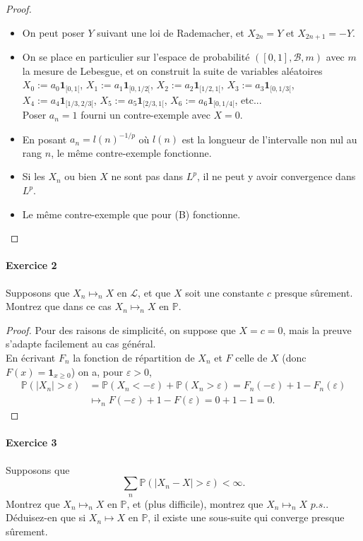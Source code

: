 \documentclass{article}
\theoremstyle{definition}
\numberwithin{equation}{section}
\begin{document}
\begin{proof}~
\begin{itemize}
\item[(A)] On peut poser $Y$ suivant une loi de Rademacher, et $X_{2n}=Y$ et $X_{2n+1}=-Y$.
\item[(B)] On se place en particulier sur l'espace de probabilité $([0,1],\mathcal{B},m)$ avec $m$ la mesure de Lebesgue, et on construit la suite de variables aléatoires $X_0:=a_0\mathbf{1}_{[0,1[}$, $X_1:=a_1\mathbf{1}_{[0,1/2[}$, $X_2:=a_2\mathbf{1}_{[1/2,1[}$, $X_3:=a_3\mathbf{1}_{[0,1/3[}$, $X_4:=a_4\mathbf{1}_{[1/3,2/3[}$, $X_5:=a_5\mathbf{1}_{[2/3,1[}$, $X_6:=a_6\mathbf{1}_{[0,1/4[}$, etc...\\
Poser $a_n=1$ fourni un contre-exemple avec $X=0$.
\item[(C)] En posant $a_n = l(n)^{-1/p}$ où $l(n)$ est la longueur de l'intervalle non nul au rang $n$, le même contre-exemple fonctionne.
\item[(D)] Si les $X_n$ ou bien $X$ ne sont pas dans $L^p$, il ne peut y avoir convergence dans $L^p$.
\item[(E)] Le même contre-exemple que pour (B) fonctionne.
\end{itemize}
\end{proof}


\paragraph{Exercice 2}
Supposons que $X_n \mapsto_n X \text{ en } \mathcal{L}$, et que $X$ soit une constante $c$ presque sûrement.\\
Montrez que dans ce cas $X_n \mapsto_n X \text{ en } \mathbb{P}$.

\begin{proof}
Pour des raisons de simplicité, on suppose que $X=c=0$, mais la preuve s'adapte facilement au cas général.\\
En écrivant $F_n$ la fonction de répartition de $X_n$ et $F$ celle de $X$ (donc $F(x)=\mathbf{1}_{x\geq 0}$) on a, pour $\varepsilon>0$,
\begin{align*}
\mathbb{P}(|X_n|>\varepsilon) &= \mathbb{P}(X_n<-\varepsilon) + \mathbb{P}(X_n>\varepsilon) = F_n(-\varepsilon) + 1 - F_n(\varepsilon)\\
&\mapsto_n F(-\varepsilon) + 1 - F(\varepsilon) = 0 + 1 - 1 = 0.
\end{align*}
\end{proof}


\paragraph{Exercice 3}
Supposons que 
$$ \sum_n \mathbb{P}(|X_n-X|>\varepsilon) < \infty. $$
Montrez que $X_n \mapsto_n X \text{ en } \mathbb{P}$, et (plus difficile), montrez que $X_n \mapsto_n X \textit{ p.s.}$.\\
Déduisez-en que si $X_n\mapsto X$ en $\mathbb{P}$, il existe une sous-suite qui converge presque sûrement.
\end{document}
